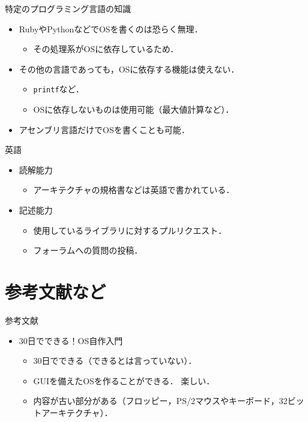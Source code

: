 \documentclass[titlepage,dvipdfmx,uplatex,a4j,12pt]{beamer}
\begin{document}
\begin{frame}{特定のプログラミング言語の知識}
    \begin{itemize}
        \item RubyやPythonなどでOSを書くのは恐らく無理．
            \begin{itemize}
                \item その処理系がOSに依存しているため．
            \end{itemize}
        \item その他の言語であっても，OSに依存する機能は使えない．
            \begin{itemize}
                \item \lstinline{printf}など．
                \item OSに依存しないものは使用可能（最大値計算など）．
            \end{itemize}
        \item アセンブリ言語だけでOSを書くことも可能．
    \end{itemize}
\end{frame}

\begin{frame}{英語}
    \begin{itemize}
        \item 読解能力
            \begin{itemize}
                \item アーキテクチャの規格書などは英語で書かれている．
            \end{itemize}
        \item 記述能力
            \begin{itemize}
                \item 使用しているライブラリに対するプルリクエスト．
                \item フォーラムへの質問の投稿．
            \end{itemize}
    \end{itemize}
\end{frame}

\section{参考文献など}

\begin{frame}{参考文献}
    \begin{itemize}
        \item 30日でできる！OS自作入門
            \begin{itemize}
                \item 30日でできる（できるとは言っていない）．
                \item GUIを備えたOSを作ることができる． 楽しい．
                \item 内容が古い部分がある（フロッピー，PS/2マウスやキーボード，32ビットアーキテクチャ）．
            \end{itemize}
    \end{itemize}
\end{frame}
\end{document}
